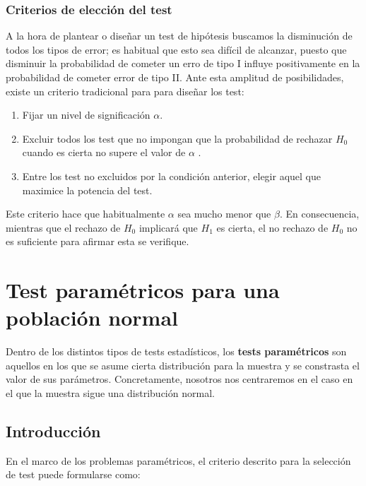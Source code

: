 \documentclass[a4paper,12pt]{article}
\begin{document}
\subsubsection{Criterios de elección del test}
    A la hora de plantear o diseñar un test de hipótesis buscamos la disminución de todos los tipos de error; es habitual que esto sea difícil de alcanzar, puesto que disminuir la probabilidad de cometer un erro de tipo I influye positivamente en la probabilidad de cometer error de tipo II. Ante esta amplitud de posibilidades, existe un criterio tradicional para para diseñar los test:
\begin{enumerate}
	\item Fijar un nivel de significación $\alpha$.
	\item Excluir todos los test que no impongan que la probabilidad de rechazar $H_0$ cuando es cierta no supere el valor de $\alpha$ . 
	\item  Entre los test no excluidos por la condición anterior, elegir aquel que maximice la potencia del test.
\end{enumerate}

    Este criterio hace que habitualmente $\alpha$ sea mucho menor que $\beta$. 
    En consecuencia, mientras que el rechazo de $H_0$ implicará que $H_1$ es cierta, el no rechazo de $H_0$ no es suficiente para afirmar esta se verifique.


\section{Test paramétricos para una población normal}

     Dentro de los distintos tipos de tests estadísticos, los \textbf{tests paramétricos} son aquellos en los que se asume cierta distribución para la muestra y se constrasta el valor de sus parámetros.
     Concretamente, nosotros nos centraremos en el caso en el que la muestra sigue una distribución normal.
     
\subsection{Introducción}
En el marco de los problemas paramétricos, el criterio descrito para la selección de test puede formularse como:
\end{document}
